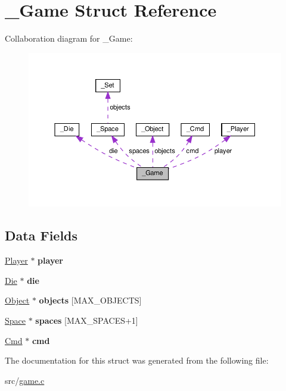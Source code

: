 \hypertarget{struct__Game}{}\section{\+\_\+\+Game Struct Reference}
\label{struct__Game}


Collaboration diagram for \+\_\+\+Game\+:
\nopagebreak
\begin{figure}[H]
\begin{center}
\leavevmode
\includegraphics[width=350pt]{struct__Game__coll__graph}
\end{center}
\end{figure}
\subsection*{Data Fields}
\begin{DoxyCompactItemize}
\item 
\mbox{\label{struct__Game_a31406605782d71ec00c4bf258ea76267}} 
\hyperlink{struct__Player}{Player} $\ast$ {\bfseries player}
\item 
\mbox{\label{struct__Game_a0d6009b5dcb080489c192a9198fa7d46}} 
\hyperlink{struct__Die}{Die} $\ast$ {\bfseries die}
\item 
\mbox{\label{struct__Game_ad45bf5645a26e546d0060a2e61f9cf81}} 
\hyperlink{struct__Object}{Object} $\ast$ {\bfseries objects} \mbox{[}M\+A\+X\+\_\+\+O\+B\+J\+E\+C\+TS\mbox{]}
\item 
\mbox{\label{struct__Game_ab4180417d9148f8abb2233ca6c4ecfe5}} 
\hyperlink{struct__Space}{Space} $\ast$ {\bfseries spaces} \mbox{[}M\+A\+X\+\_\+\+S\+P\+A\+C\+ES+1\mbox{]}
\item 
\mbox{\label{struct__Game_ac98c89af82c9ffde3f17e7f4929bb97c}} 
\hyperlink{struct__Cmd}{Cmd} $\ast$ {\bfseries cmd}
\end{DoxyCompactItemize}


The documentation for this struct was generated from the following file\+:\begin{DoxyCompactItemize}
\item 
src/\hyperlink{game_8c}{game.\+c}\end{DoxyCompactItemize}
